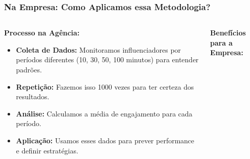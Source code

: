 \documentclass[aspectratio=169,12pt]{beamer}
\begin{document}
\begin{frame}
    \frametitle{Na Empresa: Como Aplicamos essa Metodologia?}
    
    \begin{columns}
        \begin{column}{0.6\textwidth}
            \textbf{\Large Processo na Agência:}
            \vspace{0.5cm}
            
            \begin{itemize}
                \item[\faIcon{clock}] \textcolor{azulprincipal}{\textbf{Coleta de Dados:}} Monitoramos influenciadores por períodos diferentes (10, 30, 50, 100 minutos) para entender padrões.
                \vspace{0.3cm}
                
                \item[\faIcon{repeat}] \textcolor{azulprincipal}{\textbf{Repetição:}} Fazemos isso 1000 vezes para ter certeza dos resultados.
                \vspace{0.3cm}
                
                \item[\faIcon{calculator}] \textcolor{azulprincipal}{\textbf{Análise:}} Calculamos a média de engajamento para cada período.
                \vspace{0.3cm}
                
                \item[\faIcon{target}] \textcolor{azulprincipal}{\textbf{Aplicação:}} Usamos esses dados para prever performance e definir estratégias.
            \end{itemize}
        \end{column}
        
        \begin{column}{0.4\textwidth}
            \begin{center}
                \textbf{\large Benefícios para a Empresa:}
                \vspace{0.3cm}
                
\end{center}
\end{column}
\end{columns}
\end{frame}
\end{document}
